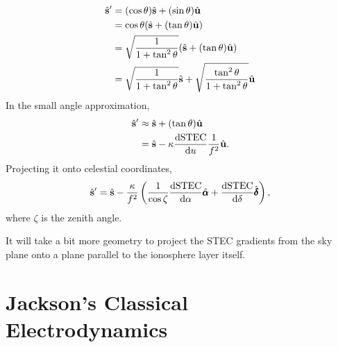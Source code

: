 \documentclass{book}
\newcommand{\deriv}[2]{\frac{\text{d}{#1}}{\text{d}{#2}}}
\newcommand{\shat}{\hat{\bf s}}
\begin{document}
\begin{equation}
    \begin{aligned}
        \shat^\prime
            &= (\cos\theta) \shat + (\sin\theta) \hat{\bf u} \\
            &= \cos\theta(\shat + (\tan\theta) \hat{\bf u}) \\
            &= \sqrt{\frac{1}{1 + \tan^2\theta}} (\shat + (\tan\theta) \hat{\bf u}) \\
            &= \sqrt{\frac{1}{1 + \tan^2\theta}} \shat + \sqrt{\frac{\tan^2\theta}{1 + \tan^2\theta}} \hat{\bf u}
    \end{aligned}
\end{equation}
In the small angle approximation,
\begin{equation}
    \begin{aligned}
        \shat^\prime
            &\approx \shat + (\tan\theta) \hat{\bf u} \\
            &= \shat - \kappa\deriv{\text{STEC}}{u} \frac{1}{f^2} \hat{\bf u}.
    \end{aligned}
\end{equation}
Projecting it onto celestial coordinates,
\begin{equation}
    \shat^\prime = \shat - \frac{\kappa}{f^2} \left( \frac{1}{\cos\zeta} \deriv{\text{STEC}}{\alpha}\hat{\pmb{\alpha}} + \deriv{\text{STEC}}{\delta}\hat{\pmb{\delta}} \right),
\end{equation}
where $\zeta$ is the zenith angle.

It will take a bit more geometry to project the STEC gradients from the sky plane onto a plane parallel to the ionosphere layer itself.

\chapter{Jackson's Classical Electrodynamics}
\end{document}
